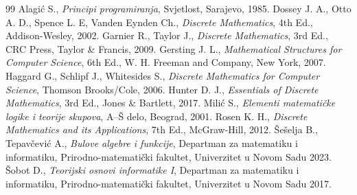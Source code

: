 \renewcommand{\bibname}{Literatura}
\begin{thebibliography}{99}
  Alagi\'c S., \textit{Principi programiranja}, Svjetlost, Sarajevo, 1985.
  Dossey J. A., Otto A. D., Spence L. E, Vanden Eynden Ch., \textit{Discrete Mathematics}, 4th Ed., Addison-Wesley, 2002.
  Garnier R., Taylor J., \textit{Discrete Mathematics}, 3rd Ed., CRC Press, Taylor \& Francis, 2009.
  Gersting J. L., \textit{Mathematical Structures for Computer Science}, 6th Ed., W. H. Freeman and Company, New York, 2007.
  Haggard G., Schlipf J., Whitesides S., \textit{Discrete Mathematics for Computer Science}, Thomson Brooks/Cole, 2006.
  Hunter D. J., \textit{Essentials of Discrete Mathematics}, 3rd Ed., Jones \& Bartlett, 2017.
  Mili\'c S., \textit{Elementi matemati\v cke logike i teorije skupova}, A--\v S delo, Beograd, 2001.
  Rosen K. H., \textit{Discrete Mathematics and its Applications}, 7th Ed., McGraw-Hill, 2012.
  \v Se\v selja B., Tepav\v cevi\'c A., \textit{Bulove algebre i funkcije}, Departman za matematiku i informatiku, Prirodno-matemati\v cki fakultet, Univerzitet u Novom Sadu 2023.
  \v Sobot D., \textit{Teorijski osnovi informatike I}, Departman za matematiku i informatiku, Prirodno-matemati\v cki fakultet, Univerzitet u Novom Sadu 2017.
\end{thebibliography}
